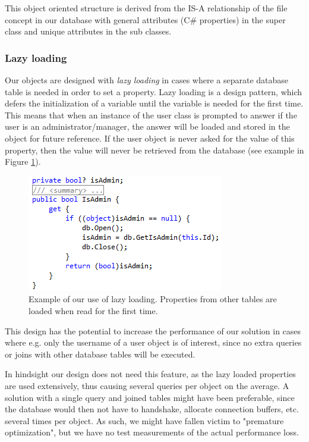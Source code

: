 This object oriented structure is derived from the IS-A relationship of the file concept in our database with general attributes (C\# properties) in the super class and unique attributes in the sub classes.

\subsubsection{Lazy loading}

Our objects are designed with \emph{lazy loading} in cases where a separate database table is needed in order to set a property. Lazy loading is a design pattern, which defers the initialization of a variable until the variable is needed for the first time. This means that when an instance of the user class is prompted to answer if the user is an administrator/manager, the answer will be loaded and stored in the object for future reference. If the user object is never asked for the value of this property, then the value will never be retrieved from the database (see example in Figure \ref{fig:lazyload}).

\begin{figure}[hbt]
	\centering
	\includegraphics[scale=0.8]{./p1design/lazyload.png}
	\caption{Example of our use of lazy loading. Properties from other
	tables are loaded when read for the first time.}
	\label{fig:lazyload}
\end{figure}


This design has the potential to increase the performance of our solution in cases
where e.g. only the username of a user object is of interest, since no extra
queries or joins with other database tables will be executed.

In hindsight our design does not need this feature, as the lazy loaded properties are used extensively, thus causing several queries per object on the average. A solution with a single query and joined tables might have been preferable, since the database would then not have to handshake, allocate connection buffers, etc. several times per object. As such, we might have fallen victim to "premature optimization"\cite{premoptim}, but we have no test measurements of the actual performance loss.


